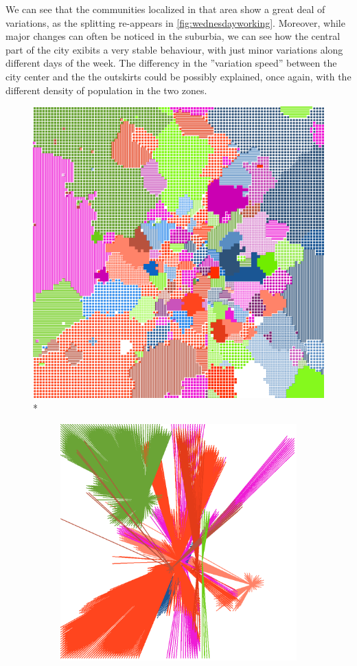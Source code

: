 \documentclass[12pt,a4paper]{article}
\begin{document}
We can see that the communities localized in that area show a great deal of variations, as the splitting re-appears in \ref{fig:wednesdayworking}.
Moreover, while major changes can often be noticed in the suburbia, we can see how the central part of the city exibits a very stable behaviour, with just minor variations along different days of the week.
The differency in the ''variation speed'' between the city center and the the outskirts could be possibly explained, once again, with the different density of population in the two zones.

\begin{figure}[H]
\centering
\includegraphics[width=0.8\linewidth]{weekDef/3Wed.png}
\\*
\begin{subfigure}[b]{0.3\textwidth}
\includegraphics[width=\textwidth]{weekDef/edges-3Wed-big.png}

\end{subfigure}
\end{figure}
\end{document}
